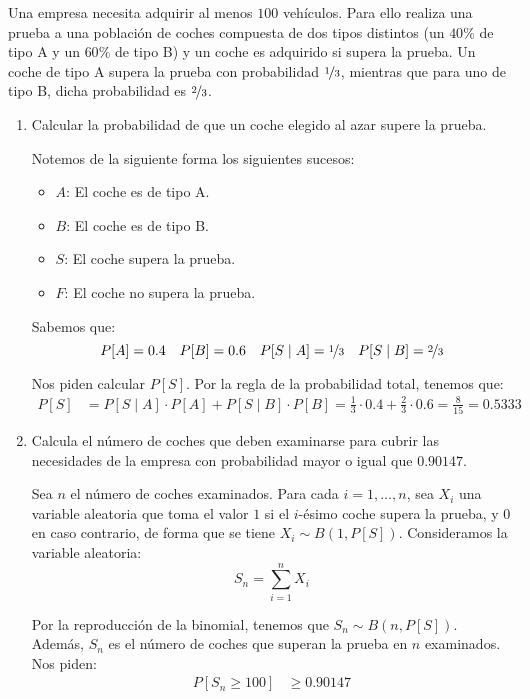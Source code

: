 \begin{ejercicio}
    Una empresa necesita adquirir al menos $100$ vehículos. Para ello realiza una prueba a una población de coches compuesta de dos tipos distintos (un $40\%$ de tipo A y un $60\%$ de tipo B) y un coche es adquirido si supera la prueba. Un coche de tipo A supera la prueba con probabilidad $\nicefrac{1}{3}$, mientras que para uno de tipo B, dicha probabilidad es $\nicefrac{2}{3}$.
    \begin{enumerate}
        \item Calcular la probabilidad de que un coche elegido al azar supere la prueba.
        
        Notemos de la siguiente forma los siguientes sucesos:
        \begin{itemize}
            \item $A$: El coche es de tipo A.
            \item $B$: El coche es de tipo B.
            \item $S$: El coche supera la prueba.
            \item $F$: El coche no supera la prueba.
        \end{itemize}

        Sabemos que:
        \begin{equation*}
            P[A] = 0.4\quad
            P[B] = 0.6\quad
            P[S\mid A] = \nicefrac{1}{3}\quad
            P[S\mid B] = \nicefrac{2}{3}
        \end{equation*}

        Nos piden calcular $P[S]$. Por la regla de la probabilidad total, tenemos que:
        \begin{align*}
            P[S] &= P[S\mid A] \cdot P[A] + P[S\mid B] \cdot P[B]
            = \frac{1}{3} \cdot 0.4 + \frac{2}{3} \cdot 0.6
            = \frac{8}{15} = 0.5333
        \end{align*}
        \item Calcula el número de coches que deben examinarse para cubrir las necesidades de la empresa con probabilidad mayor o igual que $0.90147$.
        
        Sea $n$ el número de coches examinados. Para cada $i=1, \ldots, n$, sea $X_i$ una variable aleatoria que toma el valor $1$ si el $i$-ésimo coche supera la prueba, y $0$ en caso contrario, de forma que se tiene $X_i \sim B(1, P[S])$. Consideramos la variable aleatoria:
        \[
            S_{n} = \sum_{i=1}^{n} X_i
        \]

        Por la reproducción de la binomial, tenemos que $S_{n} \sim B(n, P[S])$. Además, $S_{n}$ es el número de coches que superan la prueba en $n$ examinados. Nos piden:
        \begin{align*}
            P[S_{n} \geq 100] &\geq 0.90147
        \end{align*}


\end{enumerate}
\end{ejercicio}
